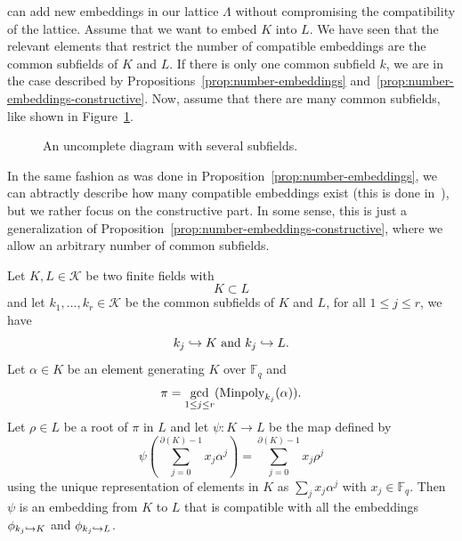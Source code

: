 can add new embeddings in our lattice $\Lambda$ without compromising the
compatibility of the lattice. Assume that we want to embed $K$ into $L$. We have
seen that the relevant elements that restrict the number of compatible
embeddings are the common subfields of $K$ and $L$. If there is only one common
subfield $k$, we are in the case described by
Propositions~\ref{prop:number-embeddings}
and~\ref{prop:number-embeddings-constructive}. Now, assume that there are many
common subfields, like shown in Figure~\ref{fig:uncomplete-sev}.%
\begin{figure}
  \centering
  \caption{An uncomplete diagram with several subfields.}
  \label{fig:uncomplete-sev}
\end{figure}
In the same fashion as was done in Proposition~\ref{prop:number-embeddings}, we
can abtractly describe how many compatible embeddings exist (this is done
in~\cite[Section 2.5]{BCS97}), but we rather focus on the constructive part. In
some sense, this is just a generalization of
Proposition~\ref{prop:number-embeddings-constructive}, where we allow an
arbitrary number of common subfields.
\begin{prop}
  \label{prop:several-subfields}
  Let $K, L\in\mathcal K$ be two finite fields with
  \[
    K\subset L
  \]
  and let $k_1, \dots, k_r\in\mathcal K$ be the common subfields of $K$ and $L$,
  \ie for all $1\leq j\leq r$, we have
  \[
    k_j\hookrightarrow K\text{ and }k_j\hookrightarrow L.
  \]
  Let $\alpha\in K$ be an element generating $K$ over $\mathbb{F}_q$ and
  \[
    \pi = \gcd_{1\leq j\leq r}(\operatorname{Minpoly}_{k_j}(\alpha)).
  \]
  Let $\rho\in L$ be a root of $\pi$ in $L$ and let $\psi:K\to L$ be the map
  defined by
  \[
    \psi(\sum_{j=0}^{\partial(K)-1}x_j\alpha^j) =
    \sum_{j=0}^{\partial(K)-1}x_j\rho^j
  \]
  using the unique representation of elements in $K$ as $\sum_j x_j\alpha^j$
  with $x_j\in\mathbb{F}_q$. Then $\psi$ is an embedding from $K$ to $L$ that is
  compatible with all the embeddings $\phi_{k_j\hookrightarrow K}$ and $\phi_{k_j\hookrightarrow L}$.
\end{prop}
